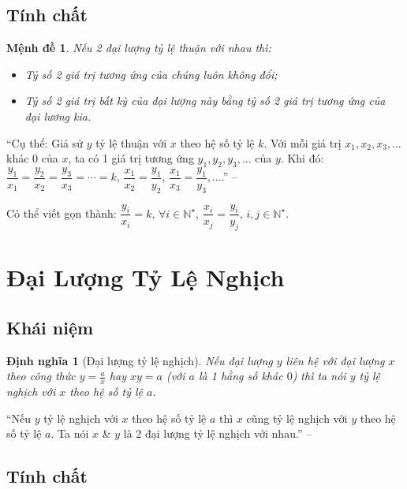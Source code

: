 \documentclass[oneside]{book}
\numberwithin{equation}{section}
\newtheorem{dinhnghia}{Định nghĩa}[section]
\newtheorem{menhde}{Mệnh đề}[section]
\begin{document}
\subsection{Tính chất}

\begin{menhde}
	Nếu 2 đại lượng tỷ lệ thuận với nhau thì:
	\begin{itemize}
		\item Tỷ số 2 giá trị tương ứng của chúng luôn không đổi;
		\item Tỷ số 2 giá trị bất kỳ của đại lượng này bằng tỷ số 2 giá trị tương ứng của đại lương kia.
	\end{itemize}
\end{menhde}
``Cụ thể: Giả sử $y$ tỷ lệ thuận với $x$ theo hệ số tỷ lệ $k$. Với mỗi giá trị $x_1,x_2,x_3,\ldots$ khác $0$ của $x$, ta có 1 giá trị tương ứng $y_1,y_2,y_3,\ldots$ của $y$. Khi đó: $\dfrac{y_1}{x_1} = \dfrac{y_2}{x_2} = \dfrac{y_3}{x_3} = \cdots = k$, $\dfrac{x_1}{x_2} = \dfrac{y_1}{y_2}$, $\dfrac{x_1}{x_3} = \dfrac{y_1}{y_3},\ldots$.'' -- \cite[p. 61]{SGK_Toan_7_Canh_Dieu_tap_1}

Có thể viết gọn thành: $\dfrac{y_i}{x_i} = k$, $\forall i\in\mathbb{N}^\star$, $\dfrac{x_i}{x_j} = \dfrac{y_i}{y_j}$, $i,j\in\mathbb{N}^\star$.

\section{Đại Lượng Tỷ Lệ Nghịch}

\subsection{Khái niệm}

\begin{dinhnghia}[Đại lượng tỷ lệ nghịch]
	Nếu đại lượng $y$ liên hệ với đại lượng $x$ theo công thức $y = \frac{a}{x}$ hay $xy = a$ (với $a$ là 1 hằng số khác $0$) thì ta nói \emph{$y$ tỷ lệ nghịch} với $x$ theo \emph{hệ số tỷ lệ $a$}.
\end{dinhnghia}
``Nếu $y$ tỷ lệ nghịch với $x$ theo hệ số tỷ lệ $a$ thì $x$ cũng tỷ lệ nghịch với $y$ theo hệ số tỷ lệ $a$. Ta nói $x$ \& $y$ là 2 đại lượng tỷ lệ nghịch với nhau.'' -- \cite[p. 64]{SGK_Toan_7_Canh_Dieu_tap_1}

\subsection{Tính chất}
\end{document}
